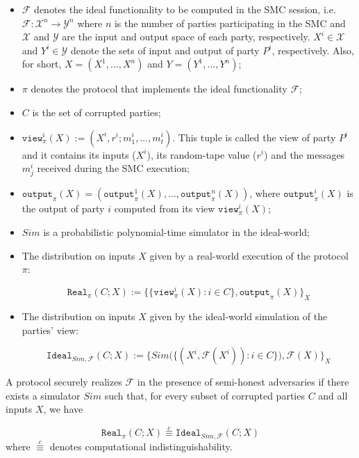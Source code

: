 \begin{itemize}
    \item $\mathcal{F}$ denotes the ideal functionality to be computed in the SMC session, i.e. $\mathcal{F}: \mathcal{X}^n \rightarrow \mathcal{Y}^n$ where $n$ is the number of parties participating in the SMC and $\mathcal{X}$ and $\mathcal{Y}$ are the input and output space of each party, respectively. $X^i\in \mathcal{X}$ and $Y^i\in \mathcal{Y}$ denote the sets of input and output of party $P^i$, respectively. Also, for short, $X = (X^1, ..., X^n)$ and $Y = (Y^1, ..., Y^n)$;
    \item $\pi$ denotes the protocol that implements the ideal functionality $\mathcal{F}$;
    \item $C$ is the set of corrupted parties;
    \item $\mathtt{view}^i_\pi(X) := (X^i, r^i; m_1^i,...,m_t^i)$. This tuple is called the view of party $P^i$ and it contains its inputs ($X^i$), its random-tape value ($r^i$) and the messages $m_j^i$ received during the SMC execution;
    \item $\mathtt{output}_\pi(X) = (\mathtt{output}^1_\pi(X), ..., \mathtt{output}^n_\pi(X))$, where $\mathtt{output}^i_\pi(X)$ is the output of party $i$ computed from its view $\mathtt{view}^i_\pi(X)$;
    \item $Sim$ is a probabilistic polynomial-time simulator in the ideal-world;
    \item The distribution on inputs $X$ given by a real-world execution of the protocol $\pi$:
    
    \begin{equation*}
    \mathtt{Real}_\pi(C; X):=\big\{\{ \mathtt{view}^i_\pi(X) : i\in C \}, \mathtt{output}_\pi(X) \big\}_{X}
    \end{equation*}
    
    \item The distribution on inputs $X$ given by the ideal-world simulation of the parties' view: 
    
    \begin{equation*}
    \mathtt{Ideal}_{Sim,\mathcal{F}}(C; X):=\big\{ Sim\big(\{(X^i, \mathcal{F}(X^i)) : i\in C \}\big), \mathcal{F}(X) \big\}_X
    \end{equation*}
\end{itemize}

\begin{definition}\label{def:security}
A protocol securely realizes $\mathcal{F}$ in the presence of semi-honest adversaries if there exists a simulator $Sim$ such that, for every subset of corrupted parties $C$ and all inputs $X$, we have

\begin{equation}
    \mathtt{Real}_\pi(C; X) \stackrel{c}{\equiv} \mathtt{Ideal}_{Sim, \mathcal{F}}(C; X)
    \label{eq:SH_security}
\end{equation}
where $\stackrel{c}{\equiv}$ denotes computational indistinguishability.

\end{definition}

